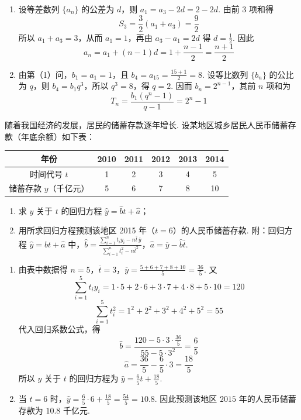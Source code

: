 \begin{solution}
\begin{enumerate}
\item 设等差数列 \(\{a_n\}\) 的公差为 \(d\)，则 \(a_1=a_3-2d=2-2d\). 由前 \(3\) 项和得
\[
S_3=\frac{3}{2}\left(a_1+a_3\right)=\frac{9}{2}
\]
所以 \(a_1+a_3=3\)，从而 \(a_1=1\)，再由 \(a_3-a_1=2d\) 得 \(d=\frac{1}{2}\). 因此
\[
a_n=a_1+(n-1)d=1+\frac{n-1}{2}=\frac{n+1}{2}
\]
\item 由第（1）问，\(b_1=a_1=1\)，且 \(b_4=a_{15}=\frac{15+1}{2}=8\). 设等比数列 \(\{b_n\}\) 的公比为 \(q\)，则 \(b_4=b_1q^3\)，所以 \(q^3=8\)，得 \(q=2\). 因而 \(b_n=2^{n-1}\)，其前 \(n\) 项和为
\[
T_n=\frac{b_1\left(q^n-1\right)}{q-1}=2^n-1
\]
\end{enumerate}
\end{solution}

\begin{problem}
随着我国经济的发展，居民的储蓄存款逐年增长. 设某地区城乡居民人民币储蓄存款（年底余额）如下表：

\begin{center}
\renewcommand{\arraystretch}{1.15}
\begin{tabular}{|c|ccccc|}
\hline
年份 & 2010 & 2011 & 2012 & 2013 & 2014 \\
\hline
时间代号 \(t\) & 1 & 2 & 3 & 4 & 5 \\
\hline
储蓄存款 \(y\)（千亿元） & 5 & 6 & 7 & 8 & 10 \\
\hline
\end{tabular}
\end{center}

\begin{enumerate}
\item 求 \(y\) 关于 \(t\) 的回归方程 \(\hat{y} = \hat{b} t + \hat{a}\)；
\item 用所求回归方程预测该地区 2015 年（\(t = 6\)）的人民币储蓄存款. 附：回归方程 \(\hat{y} = \hat{b} t + \hat{a}\) 中，\(\hat{b} = \frac{\sum_{i=1}^{n} t_{i} y_{i} - n \overline{t} \, \overline{y}}{\sum_{i=1}^{n} t_{i}^{2} - n \overline{t}^{2}}\)，\(\hat{a} = \overline{y} - \hat{b} \overline{t}\).
\end{enumerate}
\end{problem}

\begin{solution}
\begin{enumerate}
\item 由表中数据得 \(n=5\)，\(\overline{t}=3\)，\(\overline{y}=\frac{5+6+7+8+10}{5}=\frac{36}{5}\). 又
\[
\sum_{i=1}^{5}t_i y_i=1\cdot5+2\cdot6+3\cdot7+4\cdot8+5\cdot10=120
\]
\[
\sum_{i=1}^{5}t_i^2=1^2+2^2+3^2+4^2+5^2=55
\]
代入回归系数公式，得
\[
\hat{b}=\frac{120-5\cdot3\cdot\frac{36}{5}}{55-5\cdot3^2}=\frac{6}{5}
\]
\[
\hat{a}=\frac{36}{5}-\frac{6}{5}\cdot3=\frac{18}{5}
\]
所以 \(y\) 关于 \(t\) 的回归方程为 \(\hat{y}=\frac{6}{5}t+\frac{18}{5}\).
\item 当 \(t=6\) 时，\(\hat{y}=\frac{6}{5}\cdot6+\frac{18}{5}=\frac{54}{5}=10.8\). 因此预测该地区 \(2015\) 年的人民币储蓄存款为 \(10.8\) 千亿元.
\end{enumerate}
\end{solution}

